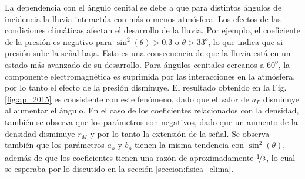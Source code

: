         La dependencia con el ángulo cenital se debe a que para distintos ángulos de incidencia la lluvia interactúa con más o menos atmósfera. Los efectos de las condiciones climáticas afectan el desarrollo de la lluvia. Por ejemplo, el coeficiente de la presión  es negativo para $\sin^2(\theta)>0.3$ o $\theta>33^o$, lo que indica que si presión sube la señal baja. Esto es una consecuencia de que la lluvia  está en un estado más avanzado de su desarrollo. Para ángulos cenitales cercanos a $60^o$, la componente electromagnética es suprimida por las interacciones en la atmósfera, por lo tanto el efecto de la presión disminuye. El resultado obtenido en la Fig.\,\ref{fig:ap_2015} es consistente con este fenómeno, dado que el valor de $a_P$ disminuye al aumentar el ángulo. 		En el caso de los coeficientes relacionados con la densidad, también se observa que los parámetros son negativos, dado que un aumento de la densidad disminuye $r_M$ y por lo tanto la extensión de la señal. Se observa también que los parámetros $a_\rho$ y $b_\rho$ tienen la misma tendencia con $\sin^2(\theta)$, además de que los coeficientes tienen una razón de aproximadamente $\nicefrac{1}{3}$, lo cual se esperaba por lo discutido en la sección \ref{seccion:fisica_clima}.

